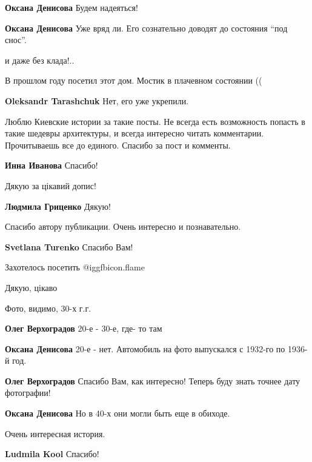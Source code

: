 \begin{itemize}
\begin{itemize}
\textbf{Оксана Денисова} Будем надеяться!

\textbf{Оксана Денисова} Уже вряд ли. Его сознательно доводят до состояния \enquote{под снос}.


и даже без клада!..
\end{itemize} %

В прошлом году посетил этот дом. Мостик в плачевном состоянии ((

\textbf{Oleksandr Tarashchuk} Нет, его уже укрепили.


Люблю Киевские истории за такие посты. Не всегда есть возможность попасть в
такие шедевры архитектуры, и всегда интересно читать комментарии. Прочитываешь
все до единого. Спасибо за пост и комменты.


\textbf{Инна Иванова} Спасибо!

Дякую за цікавий допис!

\textbf{Людмила Гриценко} Дякую!

Спасибо автору публикации. Очень интересно и познавательно.

\textbf{Svetlana Turenko} Спасибо Вам!

Захотелось посетить @igg{fbicon.flame} 

Дякую, цікаво

Фото, видимо, 30-х г.г.

\begin{itemize} %
\textbf{Олег Верхоградов} 20-е - 30-е, где- то там

\textbf{Оксана Денисова} 20-е - нет. Автомобиль на фото выпускался с 1932-го по 1936-й год.

\textbf{Олег Верхоградов} Спасибо Вам, как интересно! Теперь буду знать точнее дату фотографии!

\textbf{Оксана Денисова} Но в 40-х они могли быть еще в обиходе.
\end{itemize} %

Очень интересная история.

\textbf{Ludmila Kool} Спасибо!


\end{itemize}
